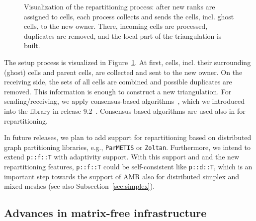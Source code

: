 \documentclass{ansarticle-preprint}
\begin{document}
\begin{figure}
    \centering
    \def\svgwidth{0.8\columnwidth}
    
    \caption{Visualization of the repartitioning process: after new ranks 
    are assigned to cells, each process collects and sends the cells, incl. 
    ghost cells, to the new owner. There, incoming cells are processed, duplicates
    are removed, and the local part of the triangulation is built.}\label{fig:repartitioning}
\end{figure}

The setup process is visualized in Figure~\ref{fig:repartitioning}. At first, cells, incl. their
surrounding (ghost) cells and parent cells, are collected and 
sent to the new owner. On the
receiving side, the sets of all cells are combined and possible duplicates
are removed. This information is enough to construct a new triangulation.
For sending/receiving, we apply consensus-based algorithms~\cite{hoefler2010scalable}, which
we introduced into the library in release 9.2~\cite{dealII92}. Consensus-based 
algorithms are used also in \cite{ibanez2016pumi} for repartitioning.

In future releases, we plan to add support for repartitioning based on distributed graph
partitioning libraries, e.g., \texttt{ParMETIS} or \texttt{Zoltan}. Furthermore, we intend to extend 
\texttt{p::f::T} with adaptivity support.
With this support and and the new repartitioning features, \texttt{p::f::T}
could be self-consistent like \texttt{p::d::T}, which is an important
step towards the support of AMR also for distributed simplex and mixed meshes
(see also Subsection~\ref{sec:simplex}).


\subsection{Advances in matrix-free infrastructure}\label{sec:mf}
\end{document}
